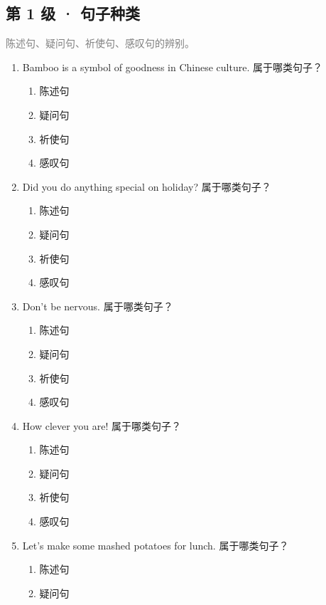\documentclass[11pt,a4paper]{ctexart}
\begin{document}
\subsection*{第 1 级 · 句子种类}
\noindent\textcolor{gray}{陈述句、疑问句、祈使句、感叹句的辨别。}\par\smallskip
\begin{enumerate}[leftmargin=*,itemsep=4pt]
\item Bamboo is a symbol of goodness in Chinese culture. 属于哪类句子？
\begin{enumerate}[label=\Alph*.,leftmargin=2em,itemsep=1pt,topsep=2pt]
\item 陈述句
\item 疑问句
\item 祈使句
\item 感叹句
\end{enumerate}
\item Did you do anything special on holiday? 属于哪类句子？
\begin{enumerate}[label=\Alph*.,leftmargin=2em,itemsep=1pt,topsep=2pt]
\item 陈述句
\item 疑问句
\item 祈使句
\item 感叹句
\end{enumerate}
\item Don’t be nervous. 属于哪类句子？
\begin{enumerate}[label=\Alph*.,leftmargin=2em,itemsep=1pt,topsep=2pt]
\item 陈述句
\item 疑问句
\item 祈使句
\item 感叹句
\end{enumerate}
\item How clever you are! 属于哪类句子？
\begin{enumerate}[label=\Alph*.,leftmargin=2em,itemsep=1pt,topsep=2pt]
\item 陈述句
\item 疑问句
\item 祈使句
\item 感叹句
\end{enumerate}
\item Let’s make some mashed potatoes for lunch. 属于哪类句子？
\begin{enumerate}[label=\Alph*.,leftmargin=2em,itemsep=1pt,topsep=2pt]
\item 陈述句
\item 疑问句

\end{enumerate}
\end{enumerate}
\end{document}
